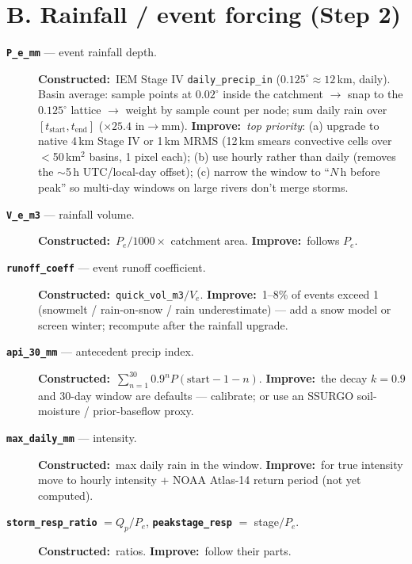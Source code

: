 \documentclass[11pt]{article}
\newcommand{\imp}{\textcolor{impcol}{\textbf{Improve:}}\ }
\newcommand{\con}{\textbf{Constructed:}\ }
\newcommand{\var}[1]{\textbf{\texttt{#1}}}
\begin{document}
\section{B. Rainfall / event forcing (Step 2)}
\begin{description}
\item[\var{P\_e\_mm} --- event rainfall depth.] \con IEM Stage IV \texttt{daily\_precip\_in}
($0.125^{\circ}\!\approx\!12$\,km, daily). Basin average: sample points at $0.02^{\circ}$ inside the
catchment $\to$ snap to the $0.125^{\circ}$ lattice $\to$ weight by sample count per node; sum daily
rain over $[t_{\text{start}},t_{\text{end}}]$ ($\times25.4$ in$\to$mm). \imp \emph{top priority}:
(a) upgrade to native 4\,km Stage IV or 1\,km MRMS (12\,km smears convective cells over $<$50\,km$^2$ basins,
1 pixel each); (b) use hourly rather than daily (removes the $\sim$5\,h UTC/local-day offset); (c) narrow the
window to ``$N$\,h before peak'' so multi-day windows on large rivers don't merge storms.
\item[\var{V\_e\_m3} --- rainfall volume.] \con $P_e/1000\times$ catchment area. \imp follows $P_e$.
\item[\var{runoff\_coeff} --- event runoff coefficient.] \con \texttt{quick\_vol\_m3}$/V_e$.
\imp 1--8\% of events exceed 1 (snowmelt / rain-on-snow / rain underestimate) --- add a snow model or
screen winter; recompute after the rainfall upgrade.
\item[\var{api\_30\_mm} --- antecedent precip index.] \con $\sum_{n=1}^{30}0.9^{n}P(\text{start}-1-n)$.
\imp the decay $k=0.9$ and 30-day window are defaults --- calibrate; or use an SSURGO soil-moisture / prior-baseflow proxy.
\item[\var{max\_daily\_mm} --- intensity.] \con max daily rain in the window. \imp for true intensity move to
hourly intensity + NOAA Atlas-14 return period (not yet computed).
\item[\var{storm\_resp\_ratio} $=Q_p/P_e$, \var{peakstage\_resp} $=$ stage$/P_e$.] \con ratios. \imp follow their parts.
\end{description}
\end{document}
